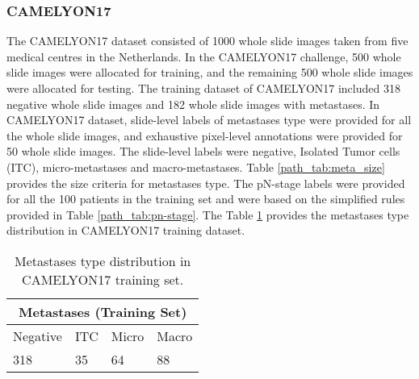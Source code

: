 \documentclass[times,twocolumn,final,authoryear]{tmp}
\begin{document}
\subsubsection{CAMELYON17}
The CAMELYON17\citep{bandi2018detection} dataset consisted of 1000 whole slide images taken from five medical centres in the Netherlands. In the CAMELYON17 challenge, 500 whole slide images were allocated for training, and the remaining 500 whole slide images were allocated for testing. The training dataset of CAMELYON17 included 318 negative whole slide images and 182 whole slide images with metastases. In CAMELYON17 dataset, slide-level labels of metastases type were provided for all the whole slide images, and exhaustive pixel-level annotations were provided for 50 whole slide images. The slide-level labels were negative, Isolated Tumor cells (ITC), micro-metastases and macro-metastases. Table \ref{path_tab:meta_size} provides the size criteria for metastases type. 
The pN-stage labels were provided for all the 100 patients in the training set and were based on the simplified rules provided in Table \ref{path_tab:pn-stage}. The Table \ref{path_tab:cm17-data} provides the metastases type distribution in CAMELYON17 training dataset. 


\begin{table}
\centering
\caption{Metastases type distribution in CAMELYON17 training set.}
\label{path_tab:cm17-data}
\begin{tabular}{llll}
\hline
\multicolumn{4}{c}{Metastases (Training Set)} \\ \hline
Negative     & ITC     & Micro     & Macro    \\
318          & 35      & 64        & 88       \\ \hline
\end{tabular}\end{table}
\end{document}

